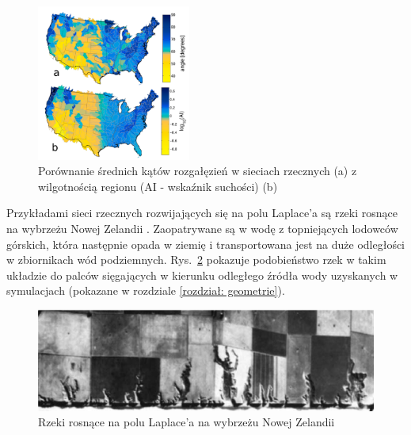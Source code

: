 \documentclass[]{pracamgr}
\begin{document}
      \begin{figure}[H]
        \centering
        \includegraphics[width=0.45\textwidth]{figs/klimat_katy.png}
        \caption{Porównanie średnich kątów rozgałęzień w sieciach rzecznych (a) z wilgotnością regionu (AI - wskaźnik suchości) (b)}
        \label{klimat_katy}
      \end{figure}

      Przykładami sieci rzecznych rozwijających się na polu Laplace'a są rzeki rosnące na wybrzeżu Nowej Zelandii \cite{schumm1986composite}. Zaopatrywane są w wodę z topniejących lodowców górskich, która następnie opada w ziemię i transportowana jest na duże odległości w zbiornikach wód podziemnych. Rys.~\ref{nowa_zelandia} pokazuje podobieństwo rzek w takim układzie do palców sięgających w kierunku odległego źródła wody uzyskanych w symulacjach (pokazane w rozdziale \ref{rozdział: geometrie}).

      \begin{figure}[h]
        \centering
        \includegraphics[width=1\textwidth]{figs/nowa_zelandia.png}
        \caption{Rzeki rosnące na polu Laplace'a na wybrzeżu Nowej Zelandii \cite{schumm1986composite}}
        \label{nowa_zelandia}
        \vspace{0pt}
      \end{figure}
\end{document}
